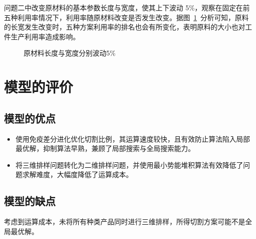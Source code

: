 \documentclass{whutmod}
\begin{document}
   	问题二中改变原材料的基本参数长度与宽度，使其上下波动 5\%，观察在固定在前五种利用率情况下，利用率随原材料改变是否发生改变。据图~\ref{adasfasad}~分析可知，原料的长宽发生改变时，五种方案利用率的排名也会有所变化，表明原料的大小也对工件生产利用率造成影响。
    \begin{figure}[H]
 	\centering
 	\caption{原材料长度与宽度分别波动5\%}\label{adasfasad}
 \end{figure}
 
 
  	\section{模型的评价}
		\subsection{模型的优点}
			\begin{itemize}                                             
			\item [(1)]使用免疫差分进化优化切割比例，其运算速度较快，且有效防止算法陷入局部最优解，抑制算法早熟，兼顾了局部搜索与全局搜索能力。
			\item [(2)] 将三维排样问题转化为二维排样问题，并使用最小势能堆积算法有效降低了问题求解难度，大幅度降低了运算成本。
			\end{itemize}
		\subsection{模型的缺点}
		考虑到运算成本，未将所有种类产品同时进行三维排样，所得切割方案可能不是全局最优解。
\end{document}

